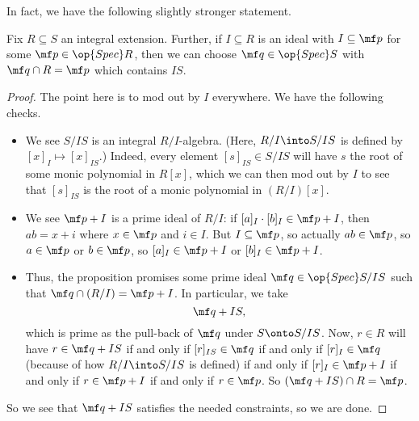 In fact, we have the following slightly stronger statement.
\begin{corollary}
	Fix $R\subseteq S$ an integral extension. Further, if $I\subseteq R$ is an ideal with $I\subseteq\mf p$ for some $\mf p\in\op{Spec}R$, then we can choose $\mf q\in\op{Spec}S$ with $\mf q\cap R=\mf p$ which contains $IS$.
\end{corollary}
\begin{proof}
	The point here is to mod out by $I$ everywhere. We have the following checks.
	\begin{itemize}
		\item We see $S/IS$ is an integral $R/I$-algebra. (Here, $R/I\into S/IS$ is defined by $[x]_I\mapsto[x]_{IS}$.) Indeed, every element $[s]_{IS}\in S/IS$ will have $s$ the root of some monic polynomial in $R[x]$, which we can then mod out by $I$ to see that $[s]_{IS}$ is the root of a monic polynomial in $(R/I)[x]$.
		\item We see $\mf p+I$ is a prime ideal of $R/I$: if $[a]_I\cdot[b]_I\in\mf p+I$, then $ab=x+i$ where $x\in\mf p$ and $i\in I$. But $I\subseteq\mf p$, so actually $ab\in\mf p$, so $a\in\mf p$ or $b\in\mf p$, so $[a]_I\in\mf p+I$ or $[b]_I\in\mf p+I$.
		\item Thus, the proposition promises some prime ideal $\mf q\in\op{Spec}S/IS$ such that $\mf q\cap(R/I)=\mf p+I$. In particular, we take
		\[\mf q+IS,\]
		which is prime as the pull-back of $\mf q$ under $S\onto S/IS$. Now, $r\in R$ will have $r\in\mf q+IS$ if and only if $[r]_{IS}\in\mf q$ if and only if $[r]_I\in\mf q$ (because of how $R/I\into S/IS$ is defined) if and only if $[r]_I\in\mf p+I$ if and only if $r\in\mf p+I$ if and only if $r\in\mf p$. So $(\mf q+IS)\cap R=\mf p$.
	\end{itemize}
	So we see that $\mf q+IS$ satisfies the needed constraints, so we are done.
\end{proof}

